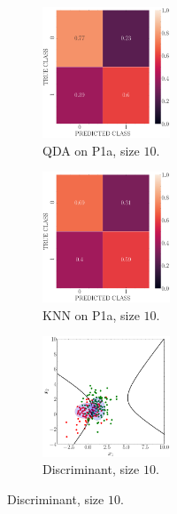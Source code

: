 \documentclass[11pt, a4 paper]{article}
\begin{document}
\begin{figure}[!htbp]
\centering
    \begin{subfigure}[!htbp]{0.24\textwidth}
       \centering
       \includegraphics[width=1.5in]{../results/ex1/conf_mtx_QD_ML_dataset_P1a_size_10.pdf}
       \caption{QDA on P1a, size $10$.}
       \label{fig:QDA_P1a_10}
    \end{subfigure}
\quad
    \begin{subfigure}[!htbp]{0.24\textwidth}
       \centering
       \includegraphics[width=1.5in]{../results/ex1/conf_mtx_KNN_dataset_P1a_size_10.pdf}
       \caption{KNN on P1a, size $10$.}
       \label{fig:KNN_P1a_10}
    \end{subfigure}
\quad
    \begin{subfigure}[!htbp]{0.24\textwidth}
       \centering
       \includegraphics[width=1.5in]{../results/ex1/samples_QD_ML_dataset_P1a_size_10.pdf}
       \caption{Discriminant, size $10$.}
       \label{fig:DF_P1a_10}
    \end{subfigure}
    

\end{figure}
\end{document}
